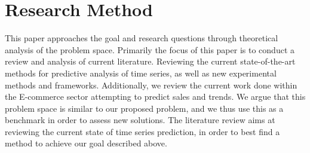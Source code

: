 \section{Research Method}
\label{section:Introduction:research-method}

This paper approaches the goal and research questions through theoretical analysis
of the problem space.
Primarily the focus of this paper is to conduct a review and analysis of current literature.
Reviewing the current state-of-the-art methods for predictive analysis of time series,
as well as new experimental methods and frameworks.
Additionally, we review the current work done within the E-commerce sector attempting to predict sales and trends.
We argue that this problem space is similar to our proposed problem, and we thus use this as a benchmark in order to assess new solutions.
The literature review aims at reviewing the current state of time series prediction,
in order to best find a method to achieve our goal described above.



\iffalse

What methodology will you apply to address the goals: theoretic/analytic, model/abstraction or design/experiment?
This section will describe the research methodology applied and the reason for this choice of research methodology.  

\fi
